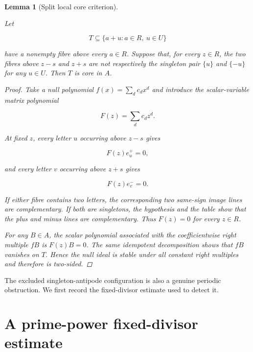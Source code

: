 \documentclass[11pt]{article}
\newtheorem{lemma}[theorem]{Lemma}
\numberwithin{equation}{section}
\begin{document}
\begin{lemma}[Split local core criterion]
\label{lem:split-core}

Let

\nopagebreak[4]
\[
T\subseteq\{a+u:a\in R,\ u\in U\}
\]

have a nonempty fibre above every $a\in R$. Suppose that, for every
$z\in R$, the two fibres above $z-s$ and $z+s$ are not respectively the
singleton pair $\{u\}$ and $\{-u\}$ for any $u\in U$. Then $T$ is core in
$A$.

\begin{proof}

Take a null polynomial $f(x)=\sum_dc_dx^d$ and introduce the scalar-variable
matrix polynomial

\nopagebreak[4]
\[
F(z)=\sum_dc_dz^d.
\]

At fixed $z$, every letter $u$ occurring above $z-s$ gives

\nopagebreak[4]
\[
F(z)e_u^+=0,
\]

and every letter $v$ occurring above $z+s$ gives

\nopagebreak[4]
\[
F(z)e_v^-=0.
\]

If either fibre contains two letters, the corresponding two same-sign image
lines are complementary. If both are singletons, the hypothesis and the
table show that the plus and minus lines are complementary. Thus $F(z)=0$
for every $z\in R$.

For any $B\in A$, the scalar polynomial associated with the coefficientwise
right multiple $fB$ is $F(z)B=0$. The same idempotent decomposition shows
that $fB$ vanishes on $T$. Hence the null ideal is stable under all constant
right multiples and therefore is two-sided.
\end{proof}

\end{lemma}


The excluded singleton-antipode configuration is also a genuine periodic
obstruction. We first record the fixed-divisor estimate used to detect it.

\section{A prime-power fixed-divisor estimate}
\end{document}
